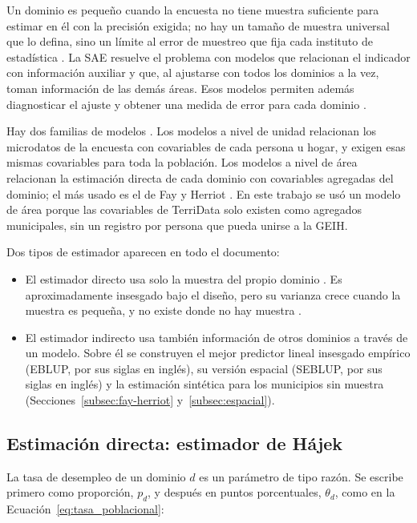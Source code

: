 Un dominio es pequeño cuando la encuesta no tiene muestra suficiente para estimar en él con la precisión exigida; no hay un tamaño de muestra universal que lo defina, sino un límite al error de muestreo que fija cada instituto de estadística \cite[pp.~14--15]{Molina2019}. La SAE resuelve el problema con modelos que relacionan el indicador con información auxiliar y que, al ajustarse con todos los dominios a la vez, toman información de las demás áreas. Esos modelos permiten además diagnosticar el ajuste y obtener una medida de error para cada dominio \cite[p.~2]{BernalGonzalez2017}.

Hay dos familias de modelos \cite[p.~17]{Molina2019}. Los modelos a nivel de unidad relacionan los microdatos de la encuesta con covariables de cada persona u hogar, y exigen esas mismas covariables para toda la población. Los modelos a nivel de área relacionan la estimación directa de cada dominio con covariables agregadas del dominio; el más usado es el de Fay y Herriot \cite{FayHerriot1979}. En este trabajo se usó un modelo de área porque las covariables de TerriData solo existen como agregados municipales, sin un registro por persona que pueda unirse a la GEIH.

Dos tipos de estimador aparecen en todo el documento:

\begin{itemize}
    \item El estimador directo usa solo la muestra del propio dominio \cite[p.~1]{BernalGonzalez2017}. Es aproximadamente insesgado bajo el diseño, pero su varianza crece cuando la muestra es pequeña, y no existe donde no hay muestra \cite[p.~2]{ColeyTellez2024}.
    \item El estimador indirecto usa también información de otros dominios a través de un modelo. Sobre él se construyen el mejor predictor lineal insesgado empírico (EBLUP, por sus siglas en inglés), su versión espacial (SEBLUP, por sus siglas en inglés) y la estimación sintética para los municipios sin muestra (Secciones~\ref{subsec:fay-herriot} y~\ref{subsec:espacial}).
\end{itemize}

\subsection{Estimación directa: estimador de Hájek}
\label{subsec:hajek}

La tasa de desempleo de un dominio $d$ es un parámetro de tipo razón. Se escribe primero como proporción, $p_d$, y después en puntos porcentuales, $\theta_d$, como en la Ecuación~\ref{eq:tasa_poblacional}:

